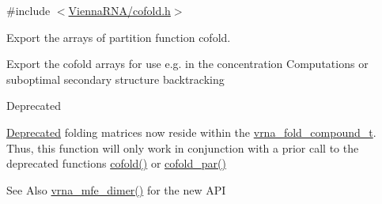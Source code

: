 {\ttfamily \#include $<$\hyperlink{cofold_8h}{Vienna\-R\-N\-A/cofold.\-h}$>$}



Export the arrays of partition function cofold. 

Export the cofold arrays for use e.\-g. in the concentration Computations or suboptimal secondary structure backtracking

\begin{DoxyRefDesc}{Deprecated}
\item[\hyperlink{deprecated__deprecated000036}{Deprecated}]folding matrices now reside within the \hyperlink{group__fold__compound_ga1b0cef17fd40466cef5968eaeeff6166}{vrna\-\_\-fold\-\_\-compound\-\_\-t}. Thus, this function will only work in conjunction with a prior call to the deprecated functions \hyperlink{group__mfe__cofold_gabc8517f22cfe70595ee81fc837910d52}{cofold()} or \hyperlink{group__mfe__cofold_ga7612cfeeb1b793f1e4179b1eb53df1f3}{cofold\-\_\-par()}\end{DoxyRefDesc}


\begin{DoxySeeAlso}{See Also}
\hyperlink{group__mfe__cofold_gaab22d10c1190f205f16a77cab9d5d3ee}{vrna\-\_\-mfe\-\_\-dimer()} for the new A\-P\-I
\end{DoxySeeAlso}


